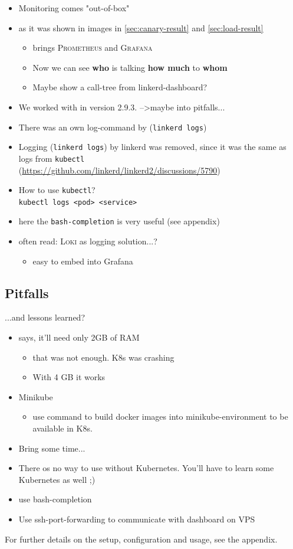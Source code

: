 \begin{itemize}
	\item Monitoring comes "out-of-box"
	\item as it was shown in images in \autoref{sec:canary-result} and \autoref{sec:load-result}
	\begin{itemize}
		\item \linkerd{} brings \textsc{Prometheus} and \textsc{Grafana}
		\item  Now we can see \textbf{who} is talking \textbf{how much} to \textbf{whom}
		\item Maybe show a call-tree from linkerd-dashboard?
	\end{itemize}

	\item We worked with \linkerd{} in version 2.9.3. -->maybe into pitfalls...
	\item There was an own log-command by \linkerd{} (\lstinline|linkerd logs|)
	\item Logging (\lstinline|linkerd logs|) by linkerd was removed, since it was the same as logs from \lstinline|kubectl|\\
	(\url{https://github.com/linkerd/linkerd2/discussions/5790})
	\item How to use \lstinline|kubectl|?\\
		\lstinline|kubectl logs <pod> <service>|
	\item here the \lstinline|bash-completion| is very useful (see appendix)
	\item often read: \textsc{Loki} as logging solution...?
	\begin{itemize}
		\item easy to embed into  Grafana
	\end{itemize}
\end{itemize}


\subsection{Pitfalls}
...and lessons learned?
\begin{itemize}
	\item \linkerd{} says, it'll need only 2GB of RAM 
	\begin{itemize}
		\item that was not enough. K8s was crashing
		\item With 4 GB it works
	\end{itemize}

	\item Minikube
	\begin{itemize}
		\item use command to build docker images into minikube-environment to be available in K8s.
	\end{itemize}

	\item Bring some time...
	\item There os no way to use \linkerd{} without Kubernetes. You'll have to learn some Kubernetes as well ;)
	\item use bash-completion
	\item Use ssh-port-forwarding to communicate with dashboard on VPS	
\end{itemize}

For further details on the setup, configuration and usage, see the appendix.